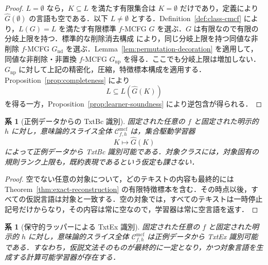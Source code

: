 \documentclass[11pt,a4paper]{ltjsarticle}
\numberwithin{equation}{section}
\theoremstyle{plain}
\newtheorem{corollary}[theorem]{系}
\theoremstyle{definition}
\theoremstyle{remark}
\newcommand{\Cmcf}[2]{\mathcal{C}^{\mathrm{mcf}}_{#1,#2}}
\begin{document}
\begin{proof}
\(L=\emptyset\) なら，\(K\subseteq L\) を満たす有限集合は \(K=\emptyset\) だけであり，定義により \(\widehat G(\emptyset)\) の言語も空である．以下 \(L\ne\emptyset\) とする．Definition~\ref{def:class-cmcf} により，\(L(G)=L\) を満たす有限標準 \(f\)-MCFG \(G\) を選ぶ．\(G\) は有限なので有限の分岐上限を持つ．標準的な削除消去構成 \cite[Lemma~2.2]{SekiEtAl1991} により，同じ分岐上限を持つ同値な非削除 \(f\)-MCFG \(G_{\mathrm{nd}}\) を選ぶ．Lemma~\ref{lem:permutation-decoration} を適用して，同値な非削除・非置換 \(f\)-MCFG \(G_{\mathrm{np}}\) を得る．ここでも分岐上限は増加しない．\(G_{\mathrm{np}}\) に対して上記の精密化，圧縮，特徴標本構成を適用する．Proposition~\ref{prop:completeness} により
\[
  L\subseteq L(\widehat G(K))
\]
を得る一方，Proposition~\ref{prop:learner-soundness} により逆包含が得られる．
\end{proof}

\begin{corollary}[正例データからの TxtBc 識別]
\label{cor:semantic-identification}
固定された任意の \(f\) と固定された明示的 \(h\) に対し，意味論的スライス全体 \(\Cmcf{f}{h}\) は，集合駆動学習器
\[
  K\longmapsto\widehat G(K)
\]
によって正例データから TxtBc 識別可能である．対象クラスには，対象固有の規則ランク上限も，既約表現であるという仮定も課さない．
\end{corollary}

\begin{proof}
空でない任意の対象について，どのテキストの内容も最終的には Theorem~\ref{thm:exact-reconstruction} の有限特徴標本を含む．その時点以後，すべての仮説言語は対象と一致する．空の対象では，すべてのテキストは一時停止記号だけからなり，その内容は常に空なので，学習器は常に空言語を返す．
\end{proof}

\begin{corollary}[保守的ラッパーによる TxtEx 識別]
\label{cor:gold-explanatory}
固定された任意の \(f\) と固定された明示的 \(h\) に対し，意味論的スライス全体 \(\Cmcf{f}{h}\) は正例データから TxtEx 識別可能である．すなわち，仮説文法そのものが最終的に一定となり，かつ対象言語を生成する計算可能学習器が存在する．
\end{corollary}
\end{document}
